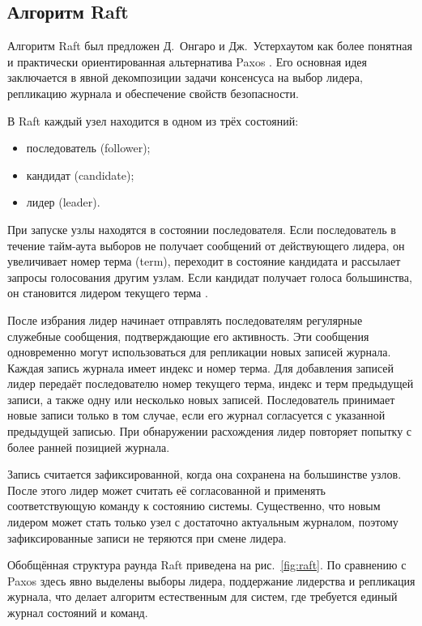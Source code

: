 \subsection{Алгоритм Raft}

Алгоритм Raft был предложен Д.~Онгаро и Дж.~Устерхаутом как более понятная и
практически ориентированная альтернатива Paxos \cite{ongario14}. Его основная
идея заключается в явной декомпозиции задачи консенсуса на выбор лидера,
репликацию журнала и обеспечение свойств безопасности.

В Raft каждый узел находится в одном из трёх состояний:

\begin{itemize}
    \item последователь (follower);
    \item кандидат (candidate);
    \item лидер (leader).
\end{itemize}

При запуске узлы находятся в состоянии последователя. Если последователь в
течение тайм-аута выборов не получает сообщений от действующего лидера, он
увеличивает номер терма (term), переходит в состояние кандидата и рассылает запросы
голосования другим узлам. Если кандидат получает голоса большинства, он
становится лидером текущего терма \cite{ongario14}.

После избрания лидер начинает отправлять последователям регулярные служебные
сообщения, подтверждающие его активность. Эти сообщения одновременно могут
использоваться для репликации новых записей журнала. Каждая запись журнала
имеет индекс и номер терма. Для добавления записей лидер передаёт последователю
номер текущего терма, индекс и терм предыдущей записи, а также одну или
несколько новых записей. Последователь принимает новые записи только в том
случае, если его журнал согласуется с указанной предыдущей записью. При
обнаружении расхождения лидер повторяет попытку с более ранней позицией
журнала.

Запись считается зафиксированной, когда она сохранена на большинстве узлов.
После этого лидер может считать её согласованной и применять соответствующую
команду к состоянию системы. Существенно, что новым лидером может стать только
узел с достаточно актуальным журналом, поэтому зафиксированные записи не
теряются при смене лидера.

Обобщённая структура раунда Raft приведена на рис.~\ref{fig:raft}. По сравнению
с Paxos здесь явно выделены выборы лидера, поддержание лидерства и репликация
журнала, что делает алгоритм естественным для систем, где требуется единый
журнал состояний и команд.

